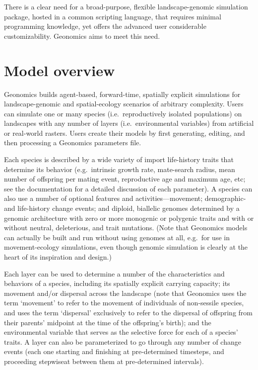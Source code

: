 ﻿\documentclass{article}
\begin{document}
There is a clear need for a broad-purpose, flexible landscape-genomic
simulation package, hosted in a common scripting language,
that requires minimal programming knowledge,
yet offers the advanced user considerable customizability.
Geonomics aims to meet this need.


\section{Model overview}

Geonomics builds agent-based, forward-time, spatially explicit simulations
for landscape-genomic and spatial-ecology scenarios of arbitrary complexity.
Users can simulate one or many species (i.e.\ reproductively isolated populations)
on landscapes with any number of layers (i.e.\ environmental variables)
from artificial or real-world rasters.
Users create their models by first generating, editing, and then processing
a Geonomics parameters file.

Each species is described by a wide variety of import life-history traits that
determine its behavior (e.g.\ intrinsic growth rate, mate-search radius, mean number of
offspring per mating event, reproductive age and maximum age, etc;
see the documentation for a detailed discussion of each parameter).
A species can also use a number of optional features
and activities---movement; demographic- and life-history change events;
and diploid, biallelic genomes determined by a genomic architecture
with zero or more monogenic or polygenic traits
and with or without neutral, deleterious, and trait mutations.
(Note that Geonomics models can actually be built and run without using genomes at all,
e.g.\ for use in movement-ecology simulations,
even though genomic simulation is clearly at
the heart of its inspiration and design.)

Each layer can be used to determine a number of the characteristics and behaviors of a
species, including its spatially explicit carrying capacity;
its movement and/or dispersal across the landscape (note that Geonomics 
uses the term `movement' to refer to the movement of individuals of non-sessile species,
and uses the term `dispersal' exclusively to refer to the dispersal of offspring from 
their parents' midpoint at the time of the offspring's birth); and the environmental
variable that serves as the selective force for each of a species' traits. A layer
can also be parameterized to go through any number of change events (each one starting
and finishing at pre-determined timesteps, and proceeding stepwiseat between them
at pre-determined intervals).
\end{document}
